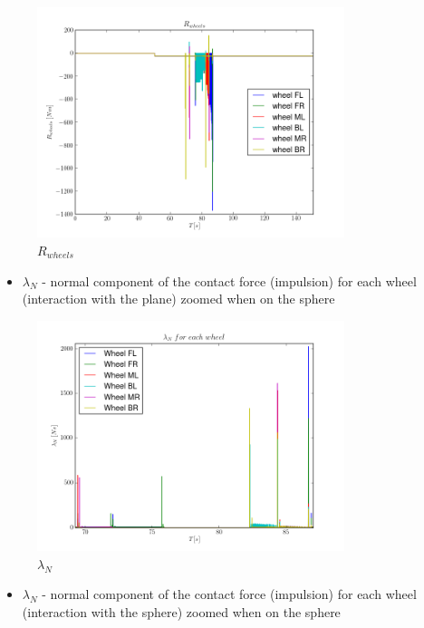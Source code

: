 \begin{figure}[H]
  \centering
    \includegraphics[width=0.8\textwidth]{pWHEELS6}
  \caption{$R_{wheels}$}
\end{figure}

\begin{itemize}
  \item $\lambda_{N}$ - normal component of the contact force (impulsion) for each wheel (interaction with the plane) zoomed when on the sphere
\end{itemize}

\begin{figure}[H]
  \centering
    \includegraphics[width=0.8\textwidth]{lambdaN6}
  \caption{$\lambda_{N}$}
\end{figure}

\begin{itemize}
  \item $\lambda_{N}$ - normal component of the contact force (impulsion) for each wheel (interaction with the sphere) zoomed when on the sphere
\end{itemize}


